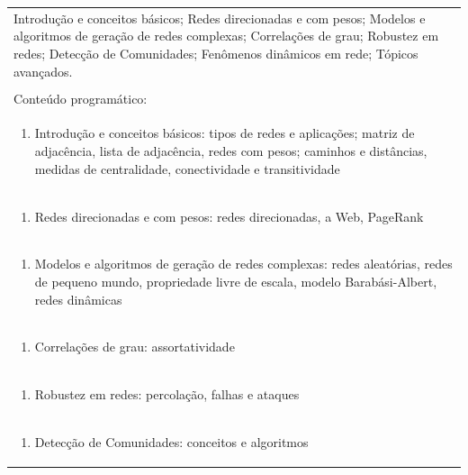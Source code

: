 \documentclass[11pt]{article}
\begin{document}
\begin{center}
\begin{longtable}{|p{4cm}|p{4cm}|p{4cm}|p{4cm}|}
\multicolumn{4}{|p{\dimexpr 16cm + 6\tabcolsep\relax}|}{Introdução e conceitos básicos; Redes direcionadas e com pesos; Modelos e algoritmos de geração de redes complexas; Correlações de grau; Robustez em redes; Detecção de Comunidades; Fenômenos dinâmicos em rede; Tópicos avançados.}\\
\multicolumn{4}{|p{16cm}|}{}\\
\hline
\multicolumn{4}{|p{16cm}|}{Conteúdo programático:}\\*
\multicolumn{4}{|p{\dimexpr 16cm + 6\tabcolsep\relax}|}{\begin{enumerate}[start=1]\item Introdução e conceitos básicos: tipos de redes e aplicações; matriz de adjacência, lista de adjacência, redes com pesos; caminhos e distâncias, medidas de centralidade, conectividade e transitividade\end{enumerate}}\\
\multicolumn{4}{|p{\dimexpr 16cm + 6\tabcolsep\relax}|}{\begin{enumerate}[start=2]\item Redes direcionadas e com pesos: redes direcionadas, a Web, PageRank\end{enumerate}}\\
\multicolumn{4}{|p{\dimexpr 16cm + 6\tabcolsep\relax}|}{\begin{enumerate}[start=3]\item Modelos e algoritmos de geração de redes complexas: redes aleatórias, redes de pequeno mundo, propriedade livre de escala, modelo Barabási-Albert, redes dinâmicas\end{enumerate}}\\
\multicolumn{4}{|p{\dimexpr 16cm + 6\tabcolsep\relax}|}{\begin{enumerate}[start=4]\item Correlações de grau: assortatividade\end{enumerate}}\\
\multicolumn{4}{|p{\dimexpr 16cm + 6\tabcolsep\relax}|}{\begin{enumerate}[start=5]\item Robustez em redes: percolação, falhas e ataques\end{enumerate}}\\
\multicolumn{4}{|p{\dimexpr 16cm + 6\tabcolsep\relax}|}{\begin{enumerate}[start=6]\item Detecção de Comunidades: conceitos e algoritmos\end{enumerate}}\\

\end{longtable}
\end{center}
\end{document}
